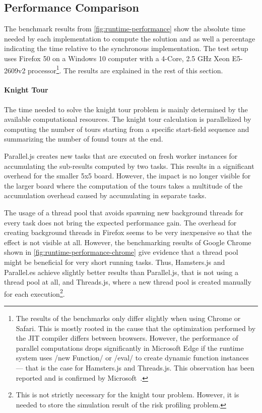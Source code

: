 \subsection{Performance Comparison}
The benchmark results from \cref{fig:runtime-performance} show the absolute time needed by each implementation to compute the solution and as well a percentage indicating the time relative to the synchronous implementation. The test setup uses Firefox 50 on a Windows 10 computer with a 4-Core, 2.5 GHz Xeon E5-2609v2 processor\footnote{The results of the benchmarks only differ slightly when using Chrome or Safari. This is mostly rooted in the cause that the optimization performed by the JIT compiler differs between browsers. However, the performance of parallel computations drops significantly in Microsoft Edge if the runtime system uses \javascriptinline/new Function/ or \javascriptinline/eval/ to create dynamic function instances --- that is the case for Hamsters.js and Threads.js. This observation has been reported and is confirmed by Microsoft~\cite{newFunctionWebWorkerEdge}.}. The results are explained in the rest of this section.

\begin{figure*}
		
	\caption{Runtime Performance of Parallelization Problems Relative to Synchronously Execution}
	\label{fig:runtime-performance}
\end{figure*}


\paragraph{Knight Tour} The time needed to solve the knight tour problem is mainly determined by the available computational resources. The knight tour calculation is parallelized by computing the number of tours starting from a specific start-field sequence and summarizing the  number of found tours at the end. 

Parallel.js creates new tasks that are executed on fresh worker instances for accumulating the sub-results computed by two tasks. This results in a significant overhead for the smaller 5x5 board. However, the impact is no longer visible for the larger board where the computation of the tours takes a multitude of the accumulation overhead caused by accumulating in separate tasks.

The usage of a thread pool that avoids spawning new background threads for every task does not bring the expected performance gain. The overhead for creating background threads in Firefox seems to be very inexpensive so that the effect is not visible at all. However, the benchmarking results of Google Chrome shown in \cref{fig:runtime-performance-chrome} give evidence that a thread pool might be beneficial for very short running tasks. Thus, Hamsters.js and Parallel.es achieve slightly better results than Parallel.js, that is not using a thread pool at all, and Threads.js, where a new thread pool is created manually for each execution\footnote{This is not strictly necessary for the knight tour problem. However, it is needed to store the simulation result of the risk profiling problem.}. 

